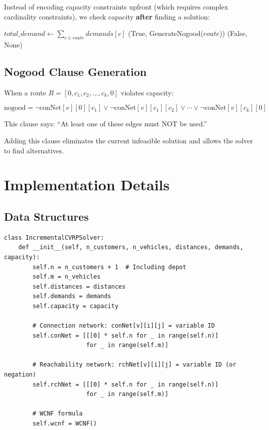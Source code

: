 \documentclass[12pt,a4paper]{article}
\theoremstyle{definition}
\begin{document}
Instead of encoding capacity constraints upfront (which requires complex cardinality constraints), we check capacity \textbf{after} finding a solution:

\begin{algorithm}[H]
\caption{Check Capacity Violation for CVRP}
\begin{algorithmic}[1]
    \State $total\_demand \gets \sum_{c \in route} demands[c]$
        \State \Return (True, GenerateNogood($route$))
    \Else
        \State \Return (False, None)
    \EndIf
\EndFunction
\end{algorithmic}
\end{algorithm}

\subsection{Nogood Clause Generation}

When a route $R = [0, c_1, c_2, \ldots, c_k, 0]$ violates capacity:

\begin{equation}
\text{nogood} = \neg\text{conNet}[v][0][c_1] \vee \neg\text{conNet}[v][c_1][c_2] \vee \cdots \vee \neg\text{conNet}[v][c_k][0]
\end{equation}

This clause says: ``At least one of these edges must NOT be used.''

Adding this clause eliminates the current infeasible solution and allows the solver to find alternatives.

\section{Implementation Details}

\subsection{Data Structures}

\begin{lstlisting}[caption={Core Data Structures}]
class IncrementalCVRPSolver:
    def __init__(self, n_customers, n_vehicles, distances, demands, capacity):
        self.n = n_customers + 1  # Including depot
        self.m = n_vehicles
        self.distances = distances
        self.demands = demands
        self.capacity = capacity
        
        # Connection network: conNet[v][i][j] = variable ID
        self.conNet = [[[0] * self.n for _ in range(self.n)] 
                       for _ in range(self.m)]
        
        # Reachability network: rchNet[v][i][j] = variable ID (or negation)
        self.rchNet = [[[0] * self.n for _ in range(self.n)] 
                       for _ in range(self.m)]
        
        # WCNF formula
        self.wcnf = WCNF()
\end{lstlisting}
\end{document}
